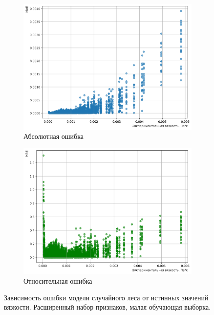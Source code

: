 \documentclass[a4paper,12pt]{article}
\begin{document}
    \begin{figure}[ht!]
      \centering
      \begin{subfigure}{0.48\textwidth}
          \centering
          \includegraphics[width=\linewidth]{random_forest/MAE_Random Forest Model_0.8_rules.png}
          \caption{Абсолютная ошибка}
      \end{subfigure}
      \hfill
      \begin{subfigure}{0.48\textwidth}
          \centering
          \includegraphics[width=\linewidth]{random_forest/MRE_Random Forest Model_0.8_rules.png}
          \caption{Относительная ошибка}
      \end{subfigure}
      \caption{Зависимость ошибки модели случайного леса от истинных значений вязкости. Расширенный набор признаков, малая обучающая выборка.}
      \label{fig:random_forest_errors_08_rules}
    \end{figure}
    
\end{document}
